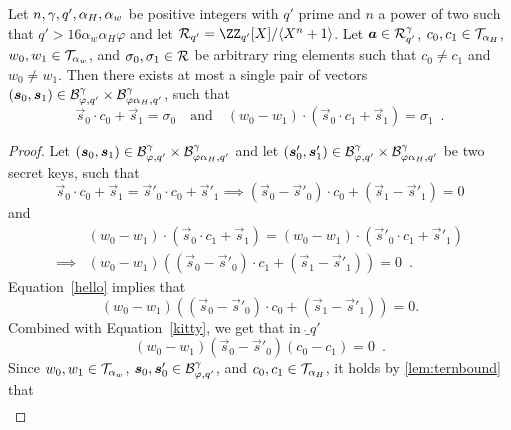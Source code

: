 \begin{lemma}\label{lem:nilssupportivechildsupport}
Let $n,\gamma,q',\alpha_H, \alpha_w$ be positive integers with $q'$ prime and $n$ a power of two such that $q' > 16 \alpha_w \alpha_H\varphi$ and let $\ring_{q'}=\defringqq$.
Let $\boldsymbol{a}\in\mathcal{R}_{q'}^\gamma$, $c_0,c_1 \in \mathcal{T}_{\alpha_{H}}$, $w_0, w_1 \in \mathcal{T}_{\alpha_w}$, and $\sigma_0,\sigma_1 \in \mathcal{R}$ be arbitrary ring elements such that $c_0\neq c_1$ and $w_0 \neq w_1$.
Then there exists at most a single pair of vectors $(\boldsymbol{s}_0,\boldsymbol{s}_1)\in\mathcal{B}_{\varphi, q'}^\gamma\times \mathcal{B}_{\varphi\alpha_H, q'}^\gamma$, such that
    \[
    \vec{s}_0\cdot c_0 + \vec{s}_1 = \sigma_0 \quad\text{and}\quad (w_0 - w_1) \cdot (\vec{s}_0\cdot c_1 + \vec{s}_1) = \sigma_1\enspace.
    \]
\end{lemma}
 \begin{proof}
    Let $(\boldsymbol{s}_0, \boldsymbol{s}_1)\in\mathcal{B}_{\varphi, q'}^\gamma\times \mathcal{B}_{\varphi\alpha_H, q'}^\gamma$ and let $(\boldsymbol{s}'_0, \boldsymbol{s}'_1)\in\mathcal{B}_{\varphi, q'}^\gamma\times \mathcal{B}_{\varphi\alpha_H, q'}^\gamma$ be two secret keys, such that 
    \begin{equation}
    \vec{s}_0\cdot c_0 + \vec{s}_1 = \vec{s}'_0\cdot c_0 + \vec{s}'_1 \implies (\vec{s}_0 - \vec{s}'_0)\cdot c_0 + (\vec{s}_1 - \vec{s}'_1) = 0 \label{hello}
    \end{equation}
    and 
    \begin{equation}
    \begin{aligned}
    &(w_0 - w_1) \cdot (\vec{s}_0\cdot c_1 + \vec{s}_1) = (w_0 - w_1) \cdot (\vec{s}'_0\cdot c_1 + \vec{s}'_1)\\ \implies& (w_0 - w_1)((\vec{s}_0 - \vec{s}'_0)\cdot c_1 + (\vec{s}_1 - \vec{s}'_1)) = 0\enspace. \label{kitty}
    \end{aligned}
    \end{equation}
    Equation~\ref{hello} implies that 
    \[
    (w_0 - w_1)((\vec{s}_0 - \vec{s}'_0)\cdot c_0 + (\vec{s}_1 - \vec{s}'_1)) = 0.
    \]
    Combined with Equation~\ref{kitty}, we get that in $\ring_{q'}$
    \begin{equation}
    (w_0 - w_1)(\vec{s}_0 - \vec{s}'_0) (c_0 - c_1)  = 0\enspace. \label{herekittykitty}
    \end{equation}
    Since $w_0,w_1\in\mathcal{T}_{\alpha_w}$, $\boldsymbol{s}_0,\boldsymbol{s}'_0 \in \mathcal{B}_{\varphi, q'}^\gamma$, and $c_0,c_1\in\mathcal{T}_{\alpha_{H}}$, it holds by \autoref{lem:ternbound} that
    \begin{align*}

\end{align*}
\end{proof}
